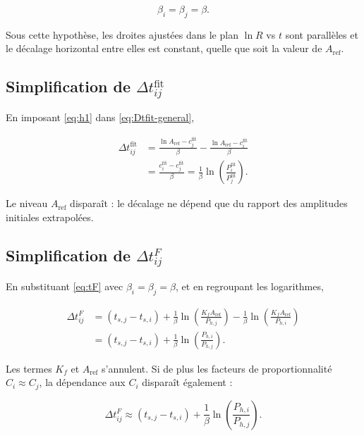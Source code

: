 \documentclass[11pt,a4paper]{article}
\newcommand{\betai}{\beta_i}                   %
\newcommand{\Pfit}{P_i^{\mathrm{fit}}}         %
\newcommand{\cfit}{c_i^{\mathrm{fit}}}         %
\newcommand{\Pproxy}{P_{h,i}}                  %
\newcommand{\Aref}{A_{\mathrm{ref}}}           %
\newcommand{\Dtfit}{\Delta t_{ij}^{\mathrm{fit}}}
\newcommand{\DtF}{\Delta t_{ij}^{F}}
\begin{document}
\begin{equation}
    \betai = \beta_j = \beta.
    \label{eq:h1}
\end{equation}

Sous cette hypothèse, les droites ajustées dans le plan \(\ln R\) vs \(t\)
sont parallèles et le décalage horizontal entre elles est constant, quelle que
soit la valeur de \(\Aref\).

\subsection{Simplification de \texorpdfstring{$\Dtfit$}{Delta t fit}}

En imposant \ref{eq:h1} dans \ref{eq:Dtfit-general},

\begin{align}
    \Dtfit
    &=
    \frac{\ln\Aref - c_j^{\mathrm{fit}}}{\beta}
    -
    \frac{\ln\Aref - \cfit}{\beta}
    \nonumber\\
    &=
    \frac{\cfit - c_j^{\mathrm{fit}}}{\beta}
    =
    \frac{1}{\beta}\ln\!\left(\frac{\Pfit}{P_j^{\mathrm{fit}}}\right).
    \label{eq:Dtfit-h1}
\end{align}

Le niveau \(\Aref\) disparaît : le décalage ne dépend que du rapport des
amplitudes initiales extrapolées.

\subsection{Simplification de \texorpdfstring{$\DtF$}{Delta t F}}

En substituant \ref{eq:tF} avec \(\betai = \beta_j = \beta\), et en regroupant
les logarithmes,

\begin{align}
    \DtF
    &=
    (t_{s,j} - t_{s,i})
    +
    \frac{1}{\beta}\ln\!\left(\frac{K_f\Aref}{P_{h,j}}\right)
    -
    \frac{1}{\beta}\ln\!\left(\frac{K_f\Aref}{\Pproxy}\right)
    \nonumber\\
    &=
    (t_{s,j} - t_{s,i})
    +
    \frac{1}{\beta}\ln\!\left(\frac{\Pproxy}{P_{h,j}}\right).
    \label{eq:DtF-h1-general}
\end{align}

Les termes \(K_f\) et \(\Aref\) s'annulent. Si de plus les facteurs de
proportionnalité \(C_i \approx C_j\), la dépendance aux \(C_i\) disparaît
également :

\begin{equation}
    \DtF
    \approx
    (t_{s,j} - t_{s,i})
    +
    \frac{1}{\beta}\ln\!\left(\frac{\Pproxy}{P_{h,j}}\right).
    \label{eq:DtF-h1}
\end{equation}
\end{document}
